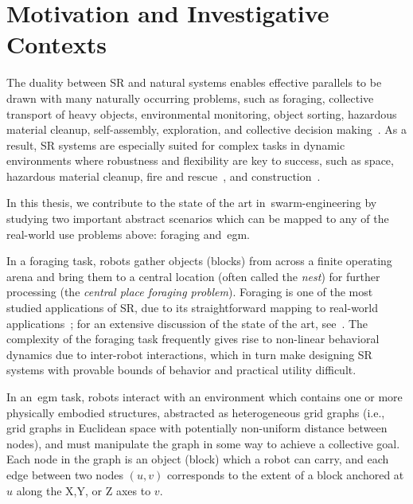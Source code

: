 \section{Motivation and Investigative Contexts}

The duality between SR and natural systems enables effective parallels to
be drawn with many naturally occurring problems, such as foraging, collective
transport of heavy objects, environmental monitoring, object sorting, hazardous
material cleanup, self-assembly, exploration, and collective decision
making~\cite{Hecker2015,Kumar2003,CarrilloZapata2020}.  As a result, SR
systems are especially suited for complex tasks in dynamic environments where
robustness and flexibility are key to success, such as space, hazardous material
cleanup, fire and
rescue~\cite{Rouff2004,CarrilloZapata2020,Sahin2005,Flushing2014}, and
construction~\cite{Petersen2011}.

In this thesis, we contribute to the state of the art in~\gls{swarm-engineering}
by studying two important abstract scenarios which can be mapped to any of the
real-world use problems above: foraging and~\gls{egm}.

In a foraging task, robots gather objects (blocks) from across a finite
operating arena and bring them to a central location (often called the
\emph{nest}) for further processing (the \emph{central place foraging
  problem}). Foraging is one of the most studied applications of SR, due to its
straightforward mapping to real-world applications~\cite{Hecker2015}; for an
extensive discussion of the state of the art, see~\cite{Lu2020}.  The complexity
of the foraging task frequently gives rise to non-linear behavioral dynamics due
to inter-robot interactions, which in turn make designing SR systems with
provable bounds of behavior and practical utility difficult.

In an~\gls{egm} task, robots interact with an environment which contains one or
more physically embodied structures, abstracted as heterogeneous grid graphs
(i.e., grid graphs in Euclidean space with potentially non-uniform distance
between nodes), and must manipulate the graph in some way to achieve a
collective goal. Each node in the graph is an object (block) which a robot can
carry, and each edge between two nodes $(u,v)$ corresponds to the extent of a
block anchored at $u$ along the X,Y, or Z axes to $v$.

